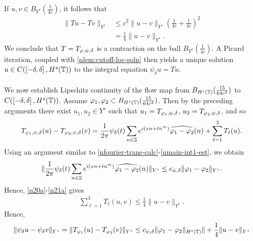 %
If $u, v \in B_{Y^{s}}(\frac{1}{4c})$, it follows that
%
\begin{equation}
	\label{n21a}
	\begin{split}
		\|Tu - Tv \|_{Y^s}
		& \le c^2 \|u -v \|_{Y^s} \left( \frac{1}{4c} + 
		\frac{1}{4c} \right)^2
		\\
		& = \frac{1}{4} \|u -v \|_{Y^s}. 
	\end{split}
\end{equation}
%
We conclude that $T = T_{\varphi, \psi, \delta}$ is a contraction on the ball
$B_{Y^{s}}(\frac{1}{4c})$. A Picard iteration, coupled with
\cref{nlem:cutoff-loc-soln} then yields a unique solution $u \in C(\left[ -\delta,
\delta \right], H^{s}(\mathbb{T}))$ to the integral equation $\psi_{\delta} u = Tu$.\\
\\
We now establish Lipschitz continuity of the flow map from
$B_{H^{s}(\mathbb{T})}(\frac{15}{64c^{3}})$ to $C(\left[ -\delta, \delta \right], H^{s}(\mathbb{T}))$.
Assume $\varphi_1, \varphi_2
\subset B_{H^s(\mathbb{T})}(\frac{15}{64c^{3}})$.
Then by the preceding arguments there exist $u_1, u_2 \in Y^s$ such that 
$u_1 = T_{\varphi_1, \psi, \delta}$, $u_2 = T_{\varphi_2, \psi, \delta}$, and so
%
%
\begin{equation*}
	\begin{split}
		T_{\varphi_1, \psi, \delta}(u) -
    T_{\varphi_2, \psi, \delta}(v) = \frac{1}{2\pi} \psi_{\delta}(t) \sum_{n \in
		\mathbb{Z}}e^{i\left( xn + tn^{m} \right)} \widehat{\varphi_1 - \varphi_2}(n) + \sum_{\ell=1
    }^{3} T_{\ell}(u).
	\end{split}
\end{equation*}
%
%
Using an argument similar to \eqref{nfourier-trans-calc}-\eqref{nmain-int1-est},
we obtain
%
%
\begin{equation*}
	\begin{split}
		\| \frac{1}{2\pi} \psi_{\delta}(t) \sum_{n \in
		\mathbb{Z}}e^{i\left( xn + tn^{m} \right)} \widehat{\varphi_1 - \varphi_2}(n)\|_{Y^s}
		\le c_{\psi,\delta} \|\varphi_{1} - \varphi_{2}\|_{Y^s}.
	\end{split}
\end{equation*}
%
%
Hence, \eqref{n20a}-\eqref{n21a} gives
%
%
\begin{equation*}
	\begin{split}
    \sum_{\ell=1}^{3} T_{\ell}(u,v) \le \frac{1}{4}\|u-v\|_{Y^s}.
	\end{split}
\end{equation*}
%
%
Hence,
%
%
\begin{equation*}
	\begin{split}
    \|\psi_{\delta} u - \psi_{\delta} v \|_{Y^s} = \|T_{\varphi_1}(u) - T_{\varphi_2}(v) \|_{Y^s} \le c_{\psi,\delta}
		\|\varphi_{1} - \varphi_{2} \|_{H^{s}\left( \mathbb{T} \right)}\| +
		\frac{1}{4} \|u -v \|_{Y^s}
	\end{split}
\end{equation*}
